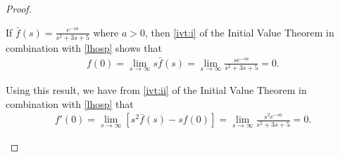 \begin{proof}
\begin{enumerate}
      If $\displaystyle \bar{f}(s) = \frac{e^{-s a}}{s^2+3s+5}$ where $a > 0$, then \eqref{ivt:i} of the Initial Value Theorem
      in combination with \eqref{lhosp} shows that
      \begin{align*}
        f(0) = \lim_{s\to \infty} s \bar{f}(s) = \lim_{s\to\infty}  \frac{s e^{-s a}}{s^2+3s+5} = 0.
      \end{align*}

      Using this result, we have from \eqref{ivt:ii} of the Initial Value Theorem in combination with \eqref{lhosp} that
      \begin{align*}
        f'(0) = \lim_{s\to\infty} [s^2 \bar{f}(s) - s f(0)] = \lim_{s\to\infty} \frac{s^2 e^{-s a}}{s^2+3s+5} = 0.
      \end{align*}
  \end{enumerate}
\end{proof}
\newpage

